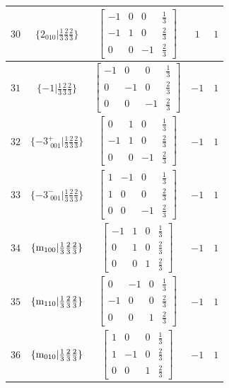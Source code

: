 \documentclass[fleqn,8pt]{jsarticle}
\begin{document}
\begin{longtable}{ccccc}
$ 30 $ & $ \{2{}_{010}|\frac{1}{3} \frac{2}{3} \frac{2}{3}\} $ & $ \begin{bmatrix} -1 & 0 & 0 & \frac{1}{3} \\ -1 & 1 & 0 & \frac{2}{3} \\ 0 & 0 & -1 & \frac{2}{3} \end{bmatrix} $ & $ 1 $ & $ 1 $ \\ \hline
$ 31 $ & $ \{-1|\frac{1}{3} \frac{2}{3} \frac{2}{3}\} $ & $ \begin{bmatrix} -1 & 0 & 0 & \frac{1}{3} \\ 0 & -1 & 0 & \frac{2}{3} \\ 0 & 0 & -1 & \frac{2}{3} \end{bmatrix} $ & $ -1 $ & $ 1 $ \\ \hline
$ 32 $ & $ \{-3^{+}_{\,\,001}|\frac{1}{3} \frac{2}{3} \frac{2}{3}\} $ & $ \begin{bmatrix} 0 & 1 & 0 & \frac{1}{3} \\ -1 & 1 & 0 & \frac{2}{3} \\ 0 & 0 & -1 & \frac{2}{3} \end{bmatrix} $ & $ -1 $ & $ 1 $ \\ \hline
$ 33 $ & $ \{-3^{-}_{\,\,001}|\frac{1}{3} \frac{2}{3} \frac{2}{3}\} $ & $ \begin{bmatrix} 1 & -1 & 0 & \frac{1}{3} \\ 1 & 0 & 0 & \frac{2}{3} \\ 0 & 0 & -1 & \frac{2}{3} \end{bmatrix} $ & $ -1 $ & $ 1 $ \\ \hline
$ 34 $ & $ \{{\rm m}_{100}|\frac{1}{3} \frac{2}{3} \frac{2}{3}\} $ & $ \begin{bmatrix} -1 & 1 & 0 & \frac{1}{3} \\ 0 & 1 & 0 & \frac{2}{3} \\ 0 & 0 & 1 & \frac{2}{3} \end{bmatrix} $ & $ -1 $ & $ 1 $ \\ \hline
$ 35 $ & $ \{{\rm m}_{110}|\frac{1}{3} \frac{2}{3} \frac{2}{3}\} $ & $ \begin{bmatrix} 0 & -1 & 0 & \frac{1}{3} \\ -1 & 0 & 0 & \frac{2}{3} \\ 0 & 0 & 1 & \frac{2}{3} \end{bmatrix} $ & $ -1 $ & $ 1 $ \\ \hline
$ 36 $ & $ \{{\rm m}_{010}|\frac{1}{3} \frac{2}{3} \frac{2}{3}\} $ & $ \begin{bmatrix} 1 & 0 & 0 & \frac{1}{3} \\ 1 & -1 & 0 & \frac{2}{3} \\ 0 & 0 & 1 & \frac{2}{3} \end{bmatrix} $ & $ -1 $ & $ 1 $ \\ \hline

\end{longtable}
\end{document}
